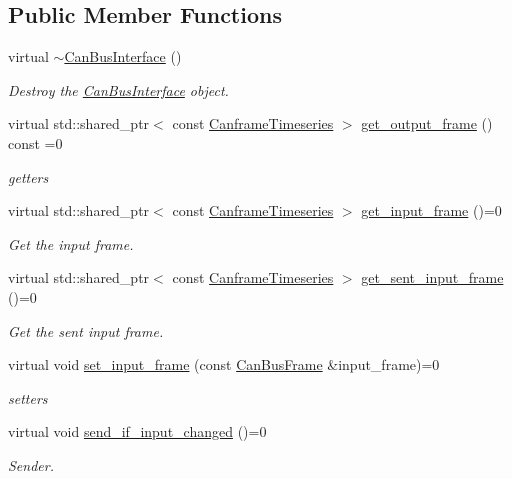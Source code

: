 \subsection*{Public Member Functions}
\begin{DoxyCompactItemize}
\item 
\mbox{\label{classblmc__drivers_1_1CanBusInterface_ac2c6e3ff3b49b04ad5f9f698eadc8690}} 
virtual \hyperlink{classblmc__drivers_1_1CanBusInterface_ac2c6e3ff3b49b04ad5f9f698eadc8690}{$\sim$\+Can\+Bus\+Interface} ()
\begin{DoxyCompactList}\small\item\em Destroy the \hyperlink{classblmc__drivers_1_1CanBusInterface}{Can\+Bus\+Interface} object. \end{DoxyCompactList}\item 
virtual std\+::shared\+\_\+ptr$<$ const \hyperlink{classblmc__drivers_1_1CanBusInterface_a2da2627c961927f48359ae7d7e1aa4da}{Canframe\+Timeseries} $>$ \hyperlink{classblmc__drivers_1_1CanBusInterface_ac169b1c119b707d2946a999b81fb5a46}{get\+\_\+output\+\_\+frame} () const =0
\begin{DoxyCompactList}\small\item\em getters \end{DoxyCompactList}\item 
virtual std\+::shared\+\_\+ptr$<$ const \hyperlink{classblmc__drivers_1_1CanBusInterface_a2da2627c961927f48359ae7d7e1aa4da}{Canframe\+Timeseries} $>$ \hyperlink{classblmc__drivers_1_1CanBusInterface_a40b62805094dc0a454695a988ab0d403}{get\+\_\+input\+\_\+frame} ()=0
\begin{DoxyCompactList}\small\item\em Get the input frame. \end{DoxyCompactList}\item 
virtual std\+::shared\+\_\+ptr$<$ const \hyperlink{classblmc__drivers_1_1CanBusInterface_a2da2627c961927f48359ae7d7e1aa4da}{Canframe\+Timeseries} $>$ \hyperlink{classblmc__drivers_1_1CanBusInterface_aca7e703983284a09c497c8182c0684d5}{get\+\_\+sent\+\_\+input\+\_\+frame} ()=0
\begin{DoxyCompactList}\small\item\em Get the sent input frame. \end{DoxyCompactList}\item 
virtual void \hyperlink{classblmc__drivers_1_1CanBusInterface_acf9305b548421e837950a0988172d57a}{set\+\_\+input\+\_\+frame} (const \hyperlink{classblmc__drivers_1_1CanBusFrame}{Can\+Bus\+Frame} \&input\+\_\+frame)=0
\begin{DoxyCompactList}\small\item\em setters \end{DoxyCompactList}\item 
virtual void \hyperlink{classblmc__drivers_1_1CanBusInterface_aa97ce2a204aa8354b8ea62af5f3820a2}{send\+\_\+if\+\_\+input\+\_\+changed} ()=0
\begin{DoxyCompactList}\small\item\em Sender. \end{DoxyCompactList}\end{DoxyCompactItemize}


